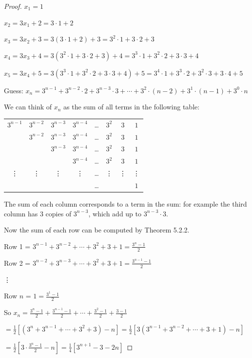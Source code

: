 \documentclass[14pt]{extarticle}
\newcommand{\dps}{\displaystyle}
\begin{document}
\begin{proof}
\(x_1 = 1\)

\(x_2 = 3x_1 + 2 = 3 \cdot 1 + 2\)

\(x_3 = 3x_2 + 3 = 3(3 \cdot 1 + 2) + 3 = 3^2 \cdot 1 + 3 \cdot 2 + 3\)

\(x_4 = 3x_3 + 4 = 3(3^2 \cdot 1 + 3 \cdot 2 + 3) + 4 = 3^3 \cdot 1 + 3^2 \cdot 2 + 3 \cdot 3 + 4\)

\(x_5 = 3x_4 + 5 = 3(3^3 \cdot 1 + 3^2 \cdot 2 + 3 \cdot 3 + 4) + 5 = 3^4 \cdot 1 + 3^3 \cdot 2 + 3^2 \cdot 3 + 3 \cdot 4 + 5\)

Guess: \(x_n = 3^{n-1} + 3^{n-2} \cdot 2 + 3^{n-3} \cdot 3 + \cdots + 3^2 \cdot (n-2) + 3^1 \cdot (n-1) + 3^0 \cdot n\)

We can think of $x_n$ as the sum of all terms in the following table:
\begin{center}
\begin{tabular}{cccccccc}
\(3^{n-1}\) & \(3^{n-2}\) & \(3^{n-3}\) & \(3^{n-4}\) & \ldots & \(3^2\) & \(3\) & \(1\) \\
            & \(3^{n-2}\) & \(3^{n-3}\) & \(3^{n-4}\) & \ldots & \(3^2\) & \(3\) & \(1\) \\
            &             & \(3^{n-3}\) & \(3^{n-4}\) & \ldots & \(3^2\) & \(3\) & \(1\) \\
            &             &             & \(3^{n-4}\) & \ldots & \(3^2\) & \(3\) & \(1\) \\
\vdots & \vdots & \vdots & \vdots & \ldots & \vdots & \vdots & \vdots \\
            &             &             &             & \ldots &         &       & \(1\)
\end{tabular}
\end{center}
The sum of each column corresponds to a term in the sum: for example the third column has 3 copies of \(3^{n-3}\), 
which add up to \(3^{n-3} \cdot 3\).

Now the sum of each row can be computed by Theorem 5.2.2.

Row 1 = \(3^{n-1} + 3^{n-2} + \cdots + 3^2 + 3 + 1 = \dps \frac{3^n - 1}{2}\)

Row 2 = \(3^{n-2} + 3^{n-3} + \cdots + 3^2 + 3 + 1 = \dps \frac{3^{n-1} - 1}{2}\)

\vdots

Row $n$ = \(1 = \dps \frac{3^{1} - 1}{2}\)

So \(\dps x_n = \frac{3^n - 1}{2} + \frac{3^{n-1} - 1}{2} + \cdots + \frac{3^2 - 1}{2} + \frac{3 - 1}{2}\)

\( = \dps \frac{1}{2}\left[(3^n + 3^{n-1} + \cdots + 3^2 + 3) - n\right] = \frac{1}{2}\left[3(3^{n-1} + 3^{n-2} + \cdots + 3 + 1) - n\right]\)

\(\dps = \frac{1}{2}\left[3 \cdot \frac{3^n - 1}{2} - n\right] = \frac{1}{4}\left[3^{n+1} - 3 - 2n\right]\)
\end{proof}
\end{document}
